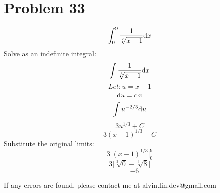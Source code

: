 \documentclass[letterpaper, 12pt]{math}
\begin{document}
\section*{Problem 33}
\[ \int_{0}^{9}{\frac{1}{\sqrt[3]{x-1}}\mathrm{d}{x}} \]
Solve as an indefinite integral:
\[ \int{\frac{1}{\sqrt[3]{x-1}}\mathrm{d}{x}} \]
\[ Let: u = x-1 \]
\[ \mathrm{d}{u} = \mathrm{d}{x} \]
\[ \int{u^{-2/3}\mathrm{d}{u}} \]
\[ 3u^{1/3}+C \]
\[ 3(x-1)^{1/3}+C \]
Substitute the original limits:
\[ 3\bigg[(x-1)^{1/3}\bigg]_{0}^{9} \]
\[ 3\bigg[\sqrt[3]{0}-\sqrt[3]{8}] \]
\[ = -6 \]

\begin{center}
  If any errors are found, please contact me at alvin.lin.dev@gmail.com
\end{center}
\end{document}
